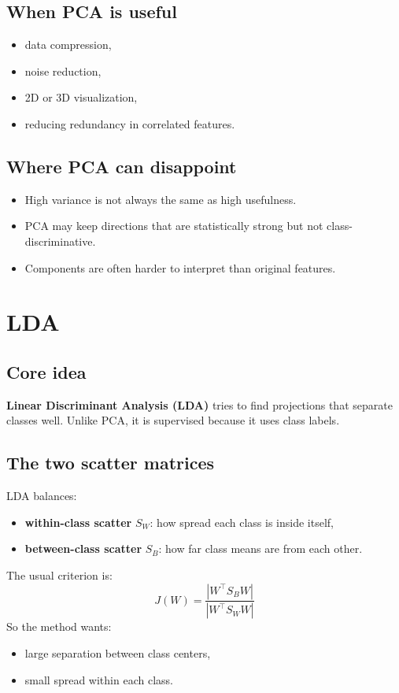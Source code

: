 \documentclass[11pt]{article}
\begin{document}
\subsection{When PCA is useful}
\begin{itemize}[leftmargin=*]
  \item data compression,
  \item noise reduction,
  \item 2D or 3D visualization,
  \item reducing redundancy in correlated features.
\end{itemize}

\subsection{Where PCA can disappoint}
\begin{itemize}[leftmargin=*]
  \item High variance is not always the same as high usefulness.
  \item PCA may keep directions that are statistically strong but not class-discriminative.
  \item Components are often harder to interpret than original features.
\end{itemize}

\section{LDA}
\subsection{Core idea}
\textbf{Linear Discriminant Analysis (LDA)} tries to find projections that separate classes well.
Unlike PCA, it is supervised because it uses class labels.

\subsection{The two scatter matrices}
LDA balances:
\begin{itemize}[leftmargin=*]
  \item \textbf{within-class scatter} $S_W$: how spread each class is inside itself,
  \item \textbf{between-class scatter} $S_B$: how far class means are from each other.
\end{itemize}
The usual criterion is:
\[
  J(W) = \frac{|W^\top S_B W|}{|W^\top S_W W|}
\]
So the method wants:
\begin{itemize}[leftmargin=*]
  \item large separation between class centers,
  \item small spread within each class.
\end{itemize}
\end{document}
